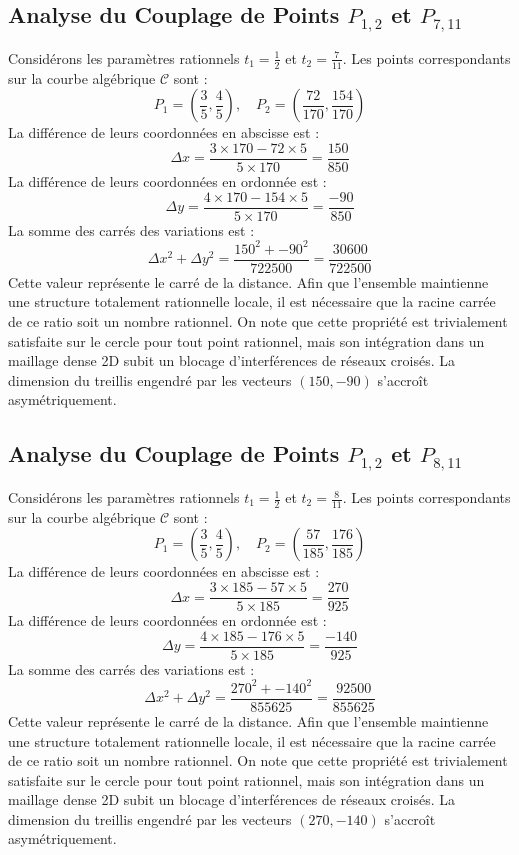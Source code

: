 \documentclass[12pt, a4paper]{article}
\begin{document}
\subsection{Analyse du Couplage de Points $P_{1,2}$ et $P_{7,11}$}
Considérons les paramètres rationnels $t_1 = \frac{1}{2}$ et $t_2 = \frac{7}{11}$.
Les points correspondants sur la courbe algébrique $\mathcal{C}$ sont :
$$ P_1 = \left( \frac{3}{5}, \frac{4}{5} \right), \quad P_2 = \left( \frac{72}{170}, \frac{154}{170} \right) $$
La différence de leurs coordonnées en abscisse est :
$$ \Delta x = \frac{3 \times 170 - 72 \times 5}{5 \times 170} = \frac{150}{850} $$
La différence de leurs coordonnées en ordonnée est :
$$ \Delta y = \frac{4 \times 170 - 154 \times 5}{5 \times 170} = \frac{-90}{850} $$
La somme des carrés des variations est :
$$ \Delta x^2 + \Delta y^2 = \frac{ 150^2 + -90^2 }{ 722500 } = \frac{ 30600 }{ 722500 } $$
Cette valeur représente le carré de la distance. Afin que l'ensemble maintienne une structure totalement rationnelle locale, il est nécessaire que la racine carrée de ce ratio soit un nombre rationnel. On note que cette propriété est trivialement satisfaite sur le cercle pour tout point rationnel, mais son intégration dans un maillage dense 2D subit un blocage d'interférences de réseaux croisés. La dimension du treillis engendré par les vecteurs $( 150, -90 )$ s'accroît asymétriquement.


\subsection{Analyse du Couplage de Points $P_{1,2}$ et $P_{8,11}$}
Considérons les paramètres rationnels $t_1 = \frac{1}{2}$ et $t_2 = \frac{8}{11}$.
Les points correspondants sur la courbe algébrique $\mathcal{C}$ sont :
$$ P_1 = \left( \frac{3}{5}, \frac{4}{5} \right), \quad P_2 = \left( \frac{57}{185}, \frac{176}{185} \right) $$
La différence de leurs coordonnées en abscisse est :
$$ \Delta x = \frac{3 \times 185 - 57 \times 5}{5 \times 185} = \frac{270}{925} $$
La différence de leurs coordonnées en ordonnée est :
$$ \Delta y = \frac{4 \times 185 - 176 \times 5}{5 \times 185} = \frac{-140}{925} $$
La somme des carrés des variations est :
$$ \Delta x^2 + \Delta y^2 = \frac{ 270^2 + -140^2 }{ 855625 } = \frac{ 92500 }{ 855625 } $$
Cette valeur représente le carré de la distance. Afin que l'ensemble maintienne une structure totalement rationnelle locale, il est nécessaire que la racine carrée de ce ratio soit un nombre rationnel. On note que cette propriété est trivialement satisfaite sur le cercle pour tout point rationnel, mais son intégration dans un maillage dense 2D subit un blocage d'interférences de réseaux croisés. La dimension du treillis engendré par les vecteurs $( 270, -140 )$ s'accroît asymétriquement.
\end{document}
